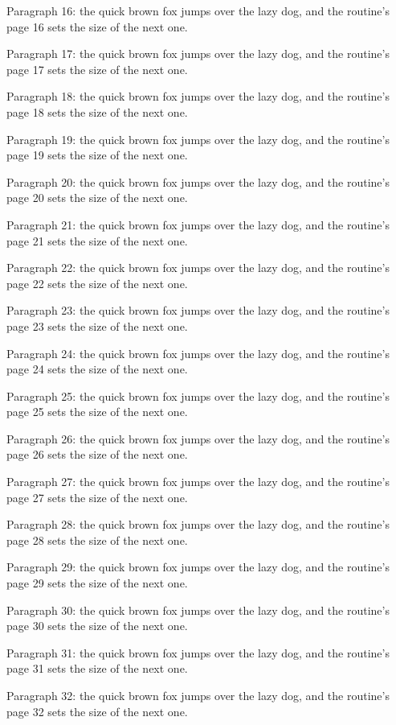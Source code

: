 Paragraph 16: the quick brown fox jumps over the lazy dog, and the routine's page 16 sets the size of the next one.\par
Paragraph 17: the quick brown fox jumps over the lazy dog, and the routine's page 17 sets the size of the next one.\par
Paragraph 18: the quick brown fox jumps over the lazy dog, and the routine's page 18 sets the size of the next one.\par
Paragraph 19: the quick brown fox jumps over the lazy dog, and the routine's page 19 sets the size of the next one.\par
Paragraph 20: the quick brown fox jumps over the lazy dog, and the routine's page 20 sets the size of the next one.\par
Paragraph 21: the quick brown fox jumps over the lazy dog, and the routine's page 21 sets the size of the next one.\par
Paragraph 22: the quick brown fox jumps over the lazy dog, and the routine's page 22 sets the size of the next one.\par
Paragraph 23: the quick brown fox jumps over the lazy dog, and the routine's page 23 sets the size of the next one.\par
Paragraph 24: the quick brown fox jumps over the lazy dog, and the routine's page 24 sets the size of the next one.\par
Paragraph 25: the quick brown fox jumps over the lazy dog, and the routine's page 25 sets the size of the next one.\par
Paragraph 26: the quick brown fox jumps over the lazy dog, and the routine's page 26 sets the size of the next one.\par
Paragraph 27: the quick brown fox jumps over the lazy dog, and the routine's page 27 sets the size of the next one.\par
Paragraph 28: the quick brown fox jumps over the lazy dog, and the routine's page 28 sets the size of the next one.\par
Paragraph 29: the quick brown fox jumps over the lazy dog, and the routine's page 29 sets the size of the next one.\par
Paragraph 30: the quick brown fox jumps over the lazy dog, and the routine's page 30 sets the size of the next one.\par
Paragraph 31: the quick brown fox jumps over the lazy dog, and the routine's page 31 sets the size of the next one.\par
Paragraph 32: the quick brown fox jumps over the lazy dog, and the routine's page 32 sets the size of the next one.\par

